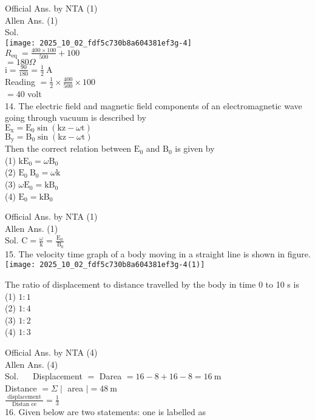 \documentclass[10pt]{article}
\begin{document}
Official Ans. by NTA (1)\\
Allen Ans. (1)\\
Sol.\\
\texttt{[image: 2025\_10\_02\_fdf5c730b8a604381ef3g-4]}\\
\(R_{\text {eq }}=\frac{400 \times 100}{500}+100\)\\
\(=180 \Omega\)\\
\(\mathrm{i}=\frac{90}{180}=\frac{1}{2} \mathrm{~A}\)\\
Reading \(=\frac{1}{2} \times \frac{400}{500} \times 100\)\\
\(=40\) volt\\
14. The electric field and magnetic field components of an electromagnetic wave going through vacuum is described by\\
\(\mathrm{E}_{\mathrm{x}}=\mathrm{E}_{0} \sin (\mathrm{kz}-\omega \mathrm{t})\)\\
\(\mathrm{B}_{\mathrm{y}}=\mathrm{B}_{0} \sin (\mathrm{kz}-\omega \mathrm{t})\)\\
Then the correct relation between \(\mathrm{E}_{0}\) and \(\mathrm{B}_{0}\) is given by\\
(1) \(\mathrm{kE}_{0}=\omega \mathrm{B}_{0}\)\\
(2) \(\mathrm{E}_{0} \mathrm{~B}_{0}=\omega \mathrm{k}\)\\
(3) \(\omega \mathrm{E}_{0}=\mathrm{kB}_{0}\)\\
(4) \(\mathrm{E}_{0}=\mathrm{kB}_{0}\)

Official Ans. by NTA (1)\\
Allen Ans. (1)\\
Sol. \(\mathrm{C}=\frac{\omega}{\mathrm{k}}=\frac{\mathrm{E}_{0}}{\mathrm{~B}_{0}}\)\\
15. The velocity time graph of a body moving in a straight line is shown in figure.\\
\texttt{[image: 2025\_10\_02\_fdf5c730b8a604381ef3g-4(1)]}

The ratio of displacement to distance travelled by the body in time 0 to 10 s is\\
(1) \(1: 1\)\\
(2) \(1: 4\)\\
(3) \(1: 2\)\\
(4) \(1: 3\)

Official Ans. by NTA (4)\\
Allen Ans. (4)\\
Sol. \(\quad\) Displacement \(=\) Darea \(=16-8+16-8=16 \mathrm{~m}\)\\
Distance \(=\Sigma \mid\) area \(\mid=48 \mathrm{~m}\)\\
\(\frac{\text { displacement }}{\text { Distan ce }}=\frac{1}{3}\)\\
16. Given below are two statements: one is labelled as
\end{document}
